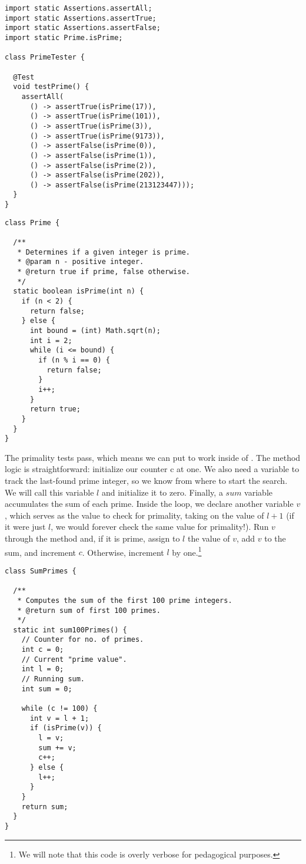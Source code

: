 \begin{lstlisting}[language=MyJava]
import static Assertions.assertAll;
import static Assertions.assertTrue;
import static Assertions.assertFalse;
import static Prime.isPrime;

class PrimeTester {

  @Test
  void testPrime() {
    assertAll(
      () -> assertTrue(isPrime(17)),
      () -> assertTrue(isPrime(101)),
      () -> assertTrue(isPrime(3)),
      () -> assertTrue(isPrime(9173)),
      () -> assertFalse(isPrime(0)),
      () -> assertFalse(isPrime(1)),
      () -> assertFalse(isPrime(2)),
      () -> assertFalse(isPrime(202)),
      () -> assertFalse(isPrime(213123447)));
  }
}
\end{lstlisting}

\begin{lstlisting}[language=MyJava]
class Prime {

  /**
   * Determines if a given integer is prime.
   * @param n - positive integer.
   * @return true if prime, false otherwise.
   */
  static boolean isPrime(int n) {
    if (n < 2) { 
      return false;
    } else {
      int bound = (int) Math.sqrt(n);
      int i = 2;
      while (i <= bound) {
        if (n % i == 0) {
          return false;
        }
        i++;
      }
      return true;
    }
  }
}
\end{lstlisting}

The primality tests pass, which means we can put  to work inside of . The method logic is straightforward: initialize our counter c at one. We also need a variable to track the last-found prime integer, so we know from where to start the search. We will call this variable $l$ and initialize it to zero. Finally, a $\mathit{sum}$ variable accumulates the sum of each prime. Inside the loop, we declare another variable $v$, which serves as the value to check for primality, taking on the value of $l + 1$ (if it were just $l$, we would forever check the same value for primality!). Run $v$ through the  method and, if it is prime, assign to $l$ the value of $v$, add $v$ to the sum, and increment $c$. Otherwise, increment $l$ by one.\footnote{We will note that this code is overly verbose for pedagogical purposes.}

\begin{lstlisting}[language=MyJava]
class SumPrimes {

  /**
   * Computes the sum of the first 100 prime integers.
   * @return sum of first 100 primes.
   */
  static int sum100Primes() {
    // Counter for no. of primes.
    int c = 0;   
    // Current "prime value".
    int l = 0;   
    // Running sum.
    int sum = 0; 
    
    while (c != 100) {
      int v = l + 1;
      if (isPrime(v)) {
        l = v;
        sum += v;
        c++;
      } else {
        l++;
      }
    }
    return sum;
  }
}
\end{lstlisting}

